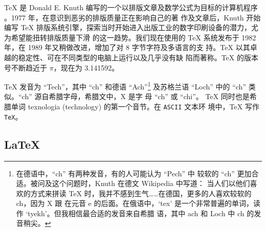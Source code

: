 \TeX{} 是 Donald E.
Knuth 编写的一个以排版文章及数学公式为目标的计算机程序 \cite{texbook}。1977 年，在意识到恶劣的排版质量正在影响自己的著
作及文章后，Knuth 开始编写 \TeX{} 排版系统引擎，探索当时开始进入出版工业的数字印刷设备的潜力，尤为希望能扭转排版质量下滑
的这一趋势。我们现在使用的 \TeX{} 系统发布于 1982 年，在 1989 年又稍做改进，增加了对 8 字节字符及多语言的支
持。\TeX{} 以其卓越的稳定性、可在不同类型的电脑上运行以及几乎没有缺
陷而著称。\TeX{} 的版本号不断趋近于 $\pi$，现在为 3.141592。


\TeX{} 发音为 ``Tech''，其中 ``ch'' 和德语 ``Ach''\footnote{在德语中，``ch'' 有两种发音，有的人可能认为 ``Pech'' 中
较软的 ``ch'' 更加合适。被问及这个问题时，Knuth 在德文 Wikipedia 中写道：{
当人们以他们喜欢的方式来拼读 \TeX{} 时，我并不感到生气……在德国，更多的人喜欢较软的 ch，因为 X 跟
在元音 e 的后面。在俄语中，`tex' 是一个非常普遍的单词，读作 `tyekh'。但我相信最合适的发音来自希腊
语，其中 ach 和 Loch 中 ch 的发音稍尖。}} 及苏格兰语 ``Loch'' 中的 ``ch'' 类似。``ch'' 源自希腊字母，希腊文中，X 是字
母 ``ch'' 或 ``chi''。 \TeX{} 同时也是希腊单词 texnologia (technology) 的第一个音节。在 \texttt{ASCII} 文本环
境中，\TeX{} 写作 \texttt{TeX}。


\subsection{\LaTeX}

